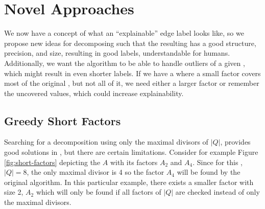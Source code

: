 \chapter{Novel Approaches}
\label{ch:novel-algos}
We now have a concept of what an \enquote{explainable} edge label looks like, so we propose new ideas for decomposing \DFAs such that the resulting \orDecomp has a good structure, precision, and size, resulting in good labels, understandable for humans.
Additionally, we want the algorithm to be able to handle outliers of a given \orDecomp, which might result in even shorter labels.
If we have a \orDecomp where a small factor covers most of the original \DFA, but not all of it, we need either a larger factor or remember the uncovered values, which could increase explainability.

\section{Greedy Short Factors}
\label{ch:novel-algos:greedy-short-factors}
Searching for a decomposition using only the maximal divisors of $|Q|$, provides good solutions in \LogSpace, but there are certain limitations.
Consider for example Figure \ref{fig:short-factors} depicting the \DFA $A$ with its factors $A_2$ and $A_4$.
Since for this \DFA, $|Q| = 8$, the only maximal divisor is 4 so the factor $A_4$ will be found by the original algorithm.
In this particular example, there exists a smaller factor with size 2, $A_2$ which will only be found if all factors of $|Q|$ are checked instead of only the maximal divisors.

